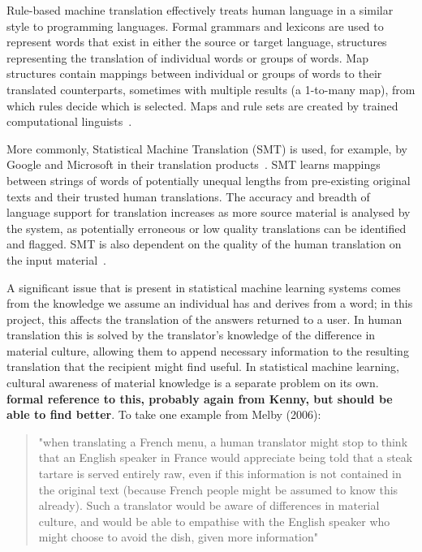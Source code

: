 \documentclass[authoryearcitations]{UoYCSproject}
\begin{document}
Rule-based machine translation effectively treats human language in a similar style to programming languages.  Formal grammars and lexicons are used to represent words that exist in either the source or target language, structures representing the translation of individual words or groups of words.  Map structures contain mappings between individual or groups of words to their translated counterparts, sometimes with multiple results (a 1-to-many map), from which rules decide which is selected.  Maps and rule sets are created by trained computational linguists~\cite{kenny2011ethics}.

More commonly, Statistical Machine Translation (SMT) is used, for example, by Google and Microsoft in their translation products~\cite{kenny2011ethics, Google_Translate_Research}.  SMT learns mappings between strings of words of potentially unequal lengths from pre-existing original texts and their trusted human translations.  The accuracy and breadth of language support for translation increases as more source material is analysed by the system, as potentially erroneous or low quality translations can be identified and flagged.  SMT is also dependent on the quality of the human translation on the input material~\cite{kenny2011ethics}.

A significant issue that is present in statistical machine learning systems comes from the knowledge we assume an individual has and derives from a word; in this project, this affects the translation of the answers returned to a user.  In human translation this is solved by the translator's knowledge of the difference in material culture, allowing them to append necessary information to the resulting translation that the recipient might find useful.  In statistical machine learning, cultural awareness of material knowledge is a separate problem on its own.  {\bf formal reference to this, probably again from Kenny, but should be able to find better}.  To take one example from Melby (2006):

\blockquote{"when translating a French menu, a human translator might stop to think that an English speaker in France would appreciate being told that a steak tartare is served entirely raw, even if this information is not contained in the original text (because French people might be assumed to know this already). Such a translator would be aware of differences in material culture, and would be able to empathise with the English speaker who might choose to avoid the dish, given more information"~\cite{melby2006can, kenny2011ethics}}
\end{document}
